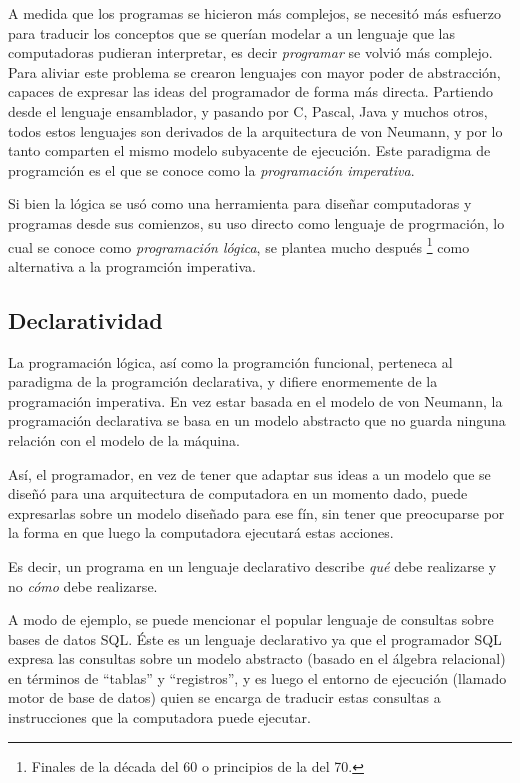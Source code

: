 \documentclass[12pt,titlepage]{article}
\begin{document}
A medida que los programas se hicieron más complejos, se necesitó más esfuerzo para traducir los conceptos que se querían modelar a un lenguaje que las computadoras pudieran interpretar, es decir \emph{programar} se volvió más complejo. Para aliviar este problema se crearon lenguajes con mayor poder de abstracción, capaces de expresar las ideas del programador de forma más directa. Partiendo desde el lenguaje ensamblador, y pasando por C, Pascal, Java y muchos otros, todos estos lenguajes son derivados de la arquitectura de von Neumann, y por lo tanto comparten el mismo modelo subyacente de ejecución. Este paradigma de programción es el que se conoce como la \emph{programación imperativa}.

Si bien la lógica se usó como una herramienta para diseñar computadoras y programas desde sus comienzos, su uso directo como lenguaje de progrmación, lo cual se conoce como \emph{programación lógica}, se plantea mucho después \footnote{Finales de la década del 60 o principios de la del 70.} como alternativa a la programción imperativa.

\subsection{Declaratividad}

La programación lógica, así como la programción funcional, perteneca al paradigma de la programción declarativa, y difiere enormemente de la programación imperativa. En vez estar basada en el modelo de von Neumann, la programación declarativa se basa en un modelo abstracto que no guarda ninguna relación con el modelo de la máquina. 

Así, el programador, en vez de tener que adaptar sus ideas a un modelo que se diseñó para una arquitectura de computadora en un momento dado, puede expresarlas sobre un modelo diseñado para ese fín, sin tener que preocuparse por la forma en que luego la computadora ejecutará estas acciones. 

Es decir, un programa en un lenguaje declarativo describe \emph{qué} debe realizarse y no \emph{cómo} debe realizarse.

A modo de ejemplo, se puede mencionar el popular lenguaje de consultas sobre bases de datos SQL. Éste es un lenguaje declarativo ya que el programador SQL expresa las consultas sobre un modelo abstracto (basado en el álgebra relacional) en términos de ``tablas'' y ``registros'', y es luego el entorno de ejecución (llamado motor de base de datos) quien se encarga de traducir estas consultas a instrucciones que la computadora puede ejecutar.
\end{document}
